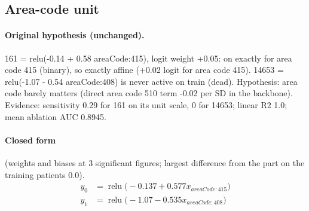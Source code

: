\documentclass[a4paper,10pt]{article}
\newif\ifreviewmarks
\newcommand{\reviewrule}{\noindent{\color{BrickRed}\rule{\linewidth}{0.8pt}}}
\newenvironment{drafted}[1][]{%
  \ifreviewmarks\par\addvspace{\medskipamount}\reviewrule\par\nopagebreak
  \noindent{\color{BrickRed}\sffamily\footnotesize\textbf{Thesis Draft}\quad #1\hfill review}\par\nopagebreak\smallskip\fi}{%
  \ifreviewmarks\par\smallskip\noindent{\color{BrickRed}\sffamily\footnotesize end of thesis draft}\par\nopagebreak\reviewrule\par\medskip\fi}
\begin{document}
\begin{drafted}[plain-language layer: churn100-s2-c2]
\subsection{Area-code unit}\label{tech:ann94}
\paragraph{Original hypothesis (unchanged).} 161 = relu(-0.14 + 0.58 areaCode:415), logit weight +0.05: on exactly for area code 415 (binary), so exactly affine (+0.02 logit for area code 415). 14653 = relu(-1.07 - 0.54 areaCode:408) is never active on train (dead). Hypothesis: area code barely matters (direct area code 510 term -0.02 per SD in the backbone). Evidence: sensitivity 0.29 for 161 on its unit scale, 0 for 14653; linear R2 1.0; mean ablation AUC 0.8945.
\paragraph{Closed form} {\footnotesize(weights and biases at 3 significant figures; largest difference from the part on the training patients 0.0).}
{\small\begingroup\allowdisplaybreaks
\begin{align*}
y_{0} &= \operatorname{relu}\bigl(-0.137 + 0.577 x_{areaCode:415}\bigr) \\
y_{1} &= \operatorname{relu}\bigl(-1.07 - 0.535 x_{areaCode:408}\bigr)
\end{align*}\endgroup}


\end{drafted}
\end{document}
